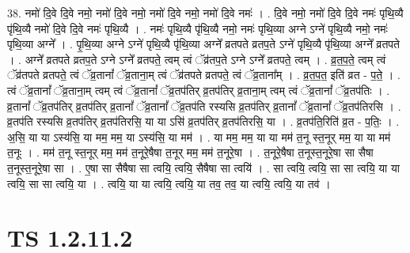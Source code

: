 \documentclass[17pt]{extarticle}
\begin{document}
38. नमो॑ दि॒वे दि॒वे नमो॒ नमो॑ दि॒वे नमो॒ नमो॑ दि॒वे नमो॒ नमो॑ दि॒वे नमः॑ । . दि॒वे नमो॒ नमो॑ दि॒वे दि॒वे नमः॑ पृथि॒व्यै पृ॑थि॒व्यै नमो॑ दि॒वे दि॒वे नमः॑ पृथि॒व्यै । . नमः॑ पृथि॒व्यै पृ॑थि॒व्यै नमो॒ नमः॑ पृथि॒व्या अग्ने ऽग्ने॑ पृथि॒व्यै नमो॒ नमः॑ पृथि॒व्या अग्ने᳚ । . पृ॒थि॒व्या अग्ने ऽग्ने॑ पृथि॒व्यै पृ॑थि॒व्या अग्ने᳚ व्रतपते व्रतप॒ते ऽग्ने॑ पृथि॒व्यै पृ॑थि॒व्या अग्ने᳚ व्रतपते । . अग्ने᳚ व्रतपते व्रतप॒ते ऽग्ने ऽग्ने᳚ व्रतपते॒ त्वम् त्वं ॅव्र॑तप॒ते ऽग्ने ऽग्ने᳚ व्रतपते॒ त्वम् । . व्र॒त॒प॒ते॒ त्वम् त्वं ॅव्र॑तपते व्रतपते॒ त्वं ॅव्र॒तानां᳚ ॅव्र॒ताना॒म् त्वं ॅव्र॑तपते व्रतपते॒ त्वं ॅव्र॒ताना᳚म् । . व्र॒त॒प॒त॒ इति॑ व्रत - प॒ते॒ । . त्वं ॅव्र॒तानां᳚ ॅव्र॒ताना॒म् त्वम् त्वं ॅव्र॒तानां᳚ ॅव्र॒तप॑तिर् व्र॒तप॑तिर् व्र॒ताना॒म् त्वम् त्वं ॅव्र॒तानां᳚ ॅव्र॒तप॑तिः । . व्र॒तानां᳚ ॅव्र॒तप॑तिर् व्र॒तप॑तिर् व्र॒तानां᳚ ॅव्र॒तानां᳚ ॅव्र॒तप॑ति रस्यसि व्र॒तप॑तिर् व्र॒तानां᳚ ॅव्र॒तानां᳚ ॅव्र॒तप॑तिरसि । . व्र॒तप॑ति रस्यसि व्र॒तप॑तिर् व्र॒तप॑तिरसि॒ या या ऽसि॑ व्र॒तप॑तिर् व्र॒तप॑तिरसि॒ या । . व्र॒तप॑ति॒रिति॑ व्र॒त - प॒तिः॒ । . अ॒सि॒ या या ऽस्य॑सि॒ या मम॒ मम॒ या ऽस्य॑सि॒ या मम॑ । . या मम॒ मम॒ या या मम॑ त॒नू स्त॒नूर् मम॒ या या मम॑ त॒नूः । . मम॑ त॒नू स्त॒नूर् मम॒ मम॑ त॒नूरे॒षैषा त॒नूर् मम॒ मम॑ त॒नूरे॒षा । . त॒नूरे॒षैषा त॒नूस्त॒नूरे॒षा सा सैषा त॒नूस्त॒नूरे॒षा सा । . ए॒षा सा सैषैषा सा त्वयि॒ त्वयि॒ सैषैषा सा त्वयि॑ । . सा त्वयि॒ त्वयि॒ सा सा त्वयि॒ या या त्वयि॒ सा सा त्वयि॒ या । . त्वयि॒ या या त्वयि॒ त्वयि॒ या तव॒ तव॒ या त्वयि॒ त्वयि॒ या तव॑ । \newline
\pagebreak
{}
\section*{ TS 1.2.11.2 }
\end{document}
